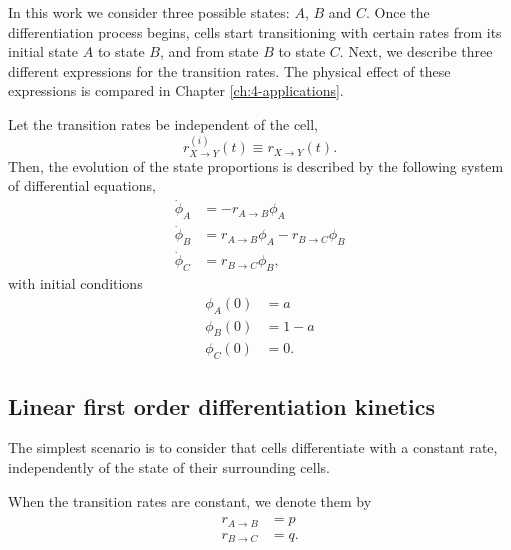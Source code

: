 In this work we consider three possible states: $A$, $B$ and $C$. Once the differentiation process begins, cells start transitioning with certain rates from its initial state $A$ to state $B$, and from state $B$ to state $C$. Next, we describe three different expressions for the transition rates. The physical effect of these expressions is compared in Chapter \ref{ch:4-applications}.

\begin{definition}
    Let the transition rates be independent of the cell,
    \begin{equation*}
        r_{X\rightarrow Y}^{(i)}(t)\equiv r_{X\rightarrow Y}(t).
    \end{equation*}
    Then, the evolution of the state proportions is described by the following system of differential equations,
    \begin{equation}\label{eq:proportions}
        \begin{aligned}
            \dot\phi_A&=-r_{A\rightarrow B}\phi_A \\
            \dot\phi_B&=r_{A\rightarrow B}\phi_A - r_{B\rightarrow C}\phi_B  \\
            \dot\phi_C&=r_{B\rightarrow C}\phi_B,
        \end{aligned}
    \end{equation}
    with initial conditions
    \begin{equation}
        \begin{aligned}
            \phi_A(0) &= a\\
            \phi_B(0) &= 1-a\\
            \phi_C(0) &= 0.
        \end{aligned}
    \end{equation}
\end{definition}



\subsection{Linear first order differentiation kinetics}

The simplest scenario is to consider that cells differentiate with a constant rate, independently of the state of their surrounding cells.

\begin{definition}\label{def:constant-rates}
    When the transition rates are constant, we denote them by
    \begin{align}
        \begin{aligned}
            r_{A\rightarrow B} &= p\\
            r_{B\rightarrow C} &= q.
        \end{aligned}
    \end{align}
\end{definition}

